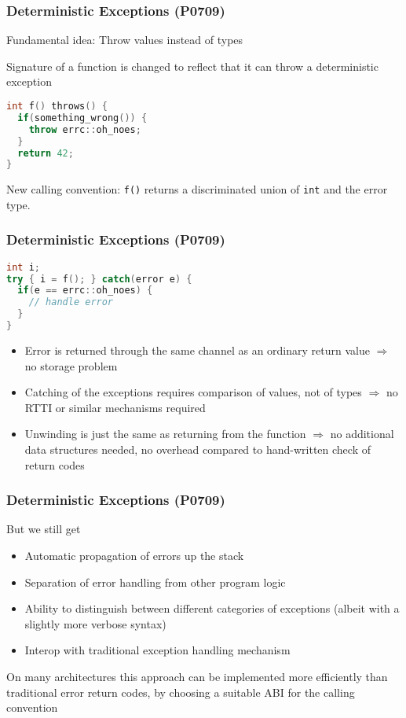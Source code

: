 \documentclass[aspectratio=169]{beamer}
\newif\iftransitions
\newcommand{\cpause}{\iftransitions \pause \fi}
\begin{document}
\begin{frame}[fragile]
  \frametitle{Deterministic Exceptions (P0709)}

  Fundamental idea: Throw values instead of types

  Signature of a function is changed to reflect that it can throw a deterministic exception
  
  \begin{lstlisting}[language={C++}]
int f() throws() {
  if(something_wrong()) {
    throw errc::oh_noes;
  }
  return 42;
}
  \end{lstlisting}

  New calling convention: \texttt{f()} returns a discriminated union of \texttt{int} and the error type.
\end{frame}


\begin{frame}[fragile]
  \frametitle{Deterministic Exceptions (P0709)}
  \begin{lstlisting}[language={C++}]
int i;
try { i = f(); } catch(error e) {
  if(e == errc::oh_noes) {
    // handle error
  }
}
  \end{lstlisting}
  
  \begin{itemize}
  \cpause \item Error is returned through the same channel as an ordinary return value $\Rightarrow$ no storage problem
  \cpause \item Catching of the exceptions requires comparison of values, not of types $\Rightarrow$ no RTTI or similar mechanisms required
  \cpause \item Unwinding is just the same as returning from the function $\Rightarrow$ no additional data structures needed, no overhead compared to hand-written check of return codes
  \end{itemize}
\end{frame}


\begin{frame}[fragile]
  \frametitle{Deterministic Exceptions (P0709)}

  But we still get
  \begin{itemize}
  \cpause \item Automatic propagation of errors up the stack
  \cpause \item Separation of error handling from other program logic
  \cpause \item Ability to distinguish between different categories of exceptions (albeit with a slightly more verbose syntax)
  \cpause \item Interop with traditional exception handling mechanism
  \end{itemize}

 \cpause 
  On many architectures this approach can be implemented more efficiently than traditional error return codes, by choosing a suitable ABI for the calling convention
\end{frame}
\end{document}
